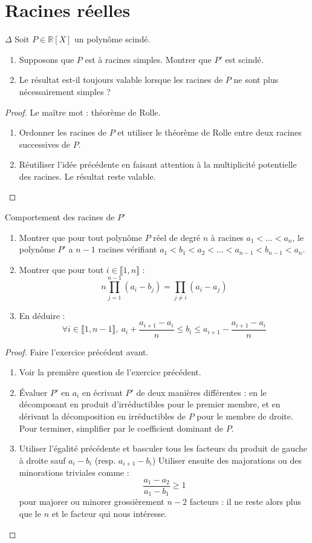 \documentclass[french,a4paper]{article}
\newcommand{\R}{\mathbb{R}}
\theoremstyle{plain}
\theoremstyle{definition}
\theoremstyle{remark}
\begin{document}
\section{Racines réelles}

\begin{ex}{$\Delta$}
	Soit $P \in \R[X]$ un polynôme scindé.
	\begin{enumerate}
		\item Supposons que $P$ est à racines simples. Montrer que $P'$ est scindé.
		\item Le résultat est-il toujours valable lorsque les racines de $P$ ne sont plus nécessairement simples ?
	\end{enumerate}
\end{ex}
\begin{proof}
	Le maître mot : théorème de Rolle. 
	\begin{enumerate}
		\item Ordonner les racines de $P$ et utiliser le théorème de Rolle entre deux racines successives de $P$.
		\item Réutiliser l'idée précédente en faisant attention à la multiplicité potentielle des racines. Le résultat reste valable.
	\end{enumerate}
\end{proof}

\begin{ex}{Comportement des racines de $P'$}
	\begin{enumerate}
		\item Montrer que pour tout polynôme $P$ réel de degré $n$ à racines $a_1<\ldots<a_n$, le polynôme $P'$ a $n-1$ racines vérifiant $a_1<b_1<a_2<\ldots<a_{n-1}<b_{n-1}<a_n$.
		\item Montrer que pour tout $i\in\llbracket1,n\rrbracket$ : $$n\prod_{j=1}^{n-1}(a_i-b_j)=\prod_{j\ne i}(a_i-a_j)$$
		\item En déduire : $$\forall i\in\llbracket1,n-1\rrbracket,\ a_i+\frac{a_{i+1}-a_i}{n}\leqslant b_i\leqslant a_{i+1}-\frac{a_{i+1}-a_i}{n}$$
	\end{enumerate}
\end{ex}
\begin{proof}
	Faire l'exercice précédent avant.
	\begin{enumerate}
		\item Voir la première question de l'exercice précédent.
		\item Évaluer $P'$ en $a_i$ en écrivant $P'$ de deux manières différentes : en le décomposant en produit d'irréductibles pour le premier membre, et en dérivant la décomposition en irréductibles de $P$ pour le membre de droite. Pour terminer, simplifier par le coefficient dominant de $P$.
		\item Utiliser l'égalité précédente et basculer tous les facteurs du produit de gauche à droite sauf $a_i-b_i$ (resp. $a_{i+1}-b_i$) Utiliser ensuite des majorations ou des minorations triviales comme : $$\frac{a_1-a_2}{a_1-b_1}\geqslant 1$$ pour majorer ou minorer grossièrement $n-2$ facteurs : il ne reste alors plus que le $n$ et le facteur qui nous intéresse.
	\end{enumerate}
\end{proof}
\end{document}
